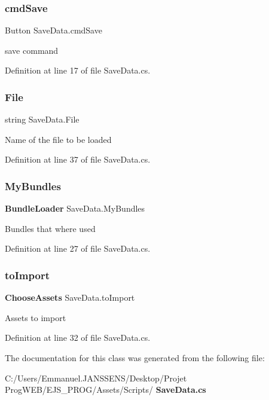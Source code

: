 \mbox{\label{class_save_data_a7074acfe8a9a2ae296882c9e688625b9}} 
\subsubsection{cmd\+Save}
{\footnotesize\ttfamily Button Save\+Data.\+cmd\+Save}



save command 



Definition at line 17 of file Save\+Data.\+cs.

\mbox{\label{class_save_data_a249b21a101bee8dca385ca31a948420c}} 
\subsubsection{File}
{\footnotesize\ttfamily string Save\+Data.\+File}



Name of the file to be loaded 



Definition at line 37 of file Save\+Data.\+cs.

\mbox{\label{class_save_data_ab05cac197a6df3b73e5e12838f917ffb}} 
\subsubsection{My\+Bundles}
{\footnotesize\ttfamily \textbf{ Bundle\+Loader} Save\+Data.\+My\+Bundles}



Bundles that where used 



Definition at line 27 of file Save\+Data.\+cs.

\mbox{\label{class_save_data_a2d18232e12dc80ae6acc7709d0b95751}} 
\subsubsection{to\+Import}
{\footnotesize\ttfamily \textbf{ Choose\+Assets} Save\+Data.\+to\+Import}



Assets to import 



Definition at line 32 of file Save\+Data.\+cs.



The documentation for this class was generated from the following file\+:\begin{DoxyCompactItemize}
\item 
C\+:/\+Users/\+Emmanuel.\+J\+A\+N\+S\+S\+E\+N\+S/\+Desktop/\+Projet Prog\+W\+E\+B/\+E\+J\+S\+\_\+\+P\+R\+O\+G/\+Assets/\+Scripts/\textbf{ Save\+Data.\+cs}\end{DoxyCompactItemize}
